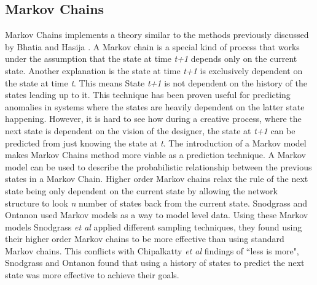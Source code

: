 \documentclass[journal]{IEEEtran}
\begin{document}
\subsection{Markov Chains}
Markov Chains implements a theory similar to the methods previously discussed by Bhatia and Hasija \cite{bhatia2016targeted}. A Markov chain is a special kind of process that works under the assumption that the state at time \textit{t+1} depends only on the current state. Another explanation is the state at time \textit{t+1} is exclusively dependent on the state at time \textit{t}. This means State \textit{t+1} is not dependent on the history of the states leading up to it\cite{ye2000markov}. This technique has been proven useful for predicting anomalies in systems \cite{ju2001hybrid, gwadera2005markov, ye2000markov} where the states are heavily dependent on the latter state happening. However, it is hard to see how during a creative process, where the next state is dependent on the vision of the designer, the state at \textit{t+1} can be predicted from just knowing the state at \textit{t}. 
The introduction of a Markov model makes Markov Chains method more viable as a prediction technique. A Markov model can be used to describe the probabilistic relationship between the previous states in a Markov Chain\cite{markov1971extension}. Higher order Markov chains relax the rule of the next state being only dependent on the current state by allowing the network structure to look \textit{n} number of states back from the current state\cite{ching2008higher}. Snodgrass and Ontanon\cite{snodgrass2017learning} used Markov models as a way to model level data. Using these Markov models Snodgrass \textit{et al}\cite{snodgrass2017learning} applied different sampling techniques, they found using their higher order Markov chains to be more effective than using standard Markov chains. This conflicts with Chipalkatty \textit{et al}\cite{chipalkatty2013less} findings of ``less is more", Snodgrass and Ontanon\cite{snodgrass2017learning} found that using a history of states to predict the next state was more effective to achieve their goals.
\end{document}
